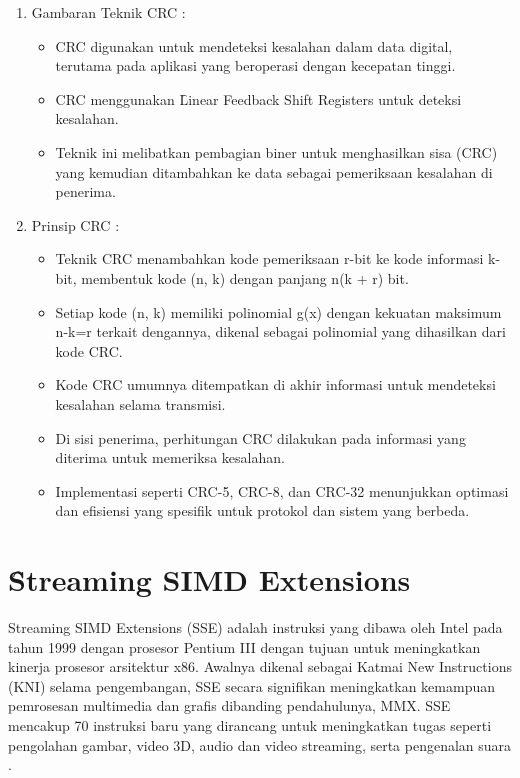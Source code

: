\begin{enumerate}
	\item Gambaran Teknik CRC \cite{zhangLowComplexityCRC}:
	      \begin{itemize}
		      \item CRC digunakan untuk mendeteksi kesalahan dalam data digital, terutama pada aplikasi yang beroperasi dengan kecepatan tinggi.
		      \item CRC menggunakan \f{Linear Feedback Shift Registers} untuk deteksi kesalahan.
		      \item Teknik ini melibatkan pembagian biner untuk menghasilkan sisa (CRC) yang kemudian ditambahkan ke data sebagai pemeriksaan kesalahan di penerima.
	      \end{itemize}

	\item Prinsip CRC \cite{SrideviCRCDataRecovery}:
	      \begin{itemize}
		      \item Teknik CRC menambahkan kode pemeriksaan r-bit ke kode informasi k-bit, membentuk kode (n, k) dengan panjang n(k + r) bit.
		      \item Setiap kode (n, k) memiliki polinomial g(x) dengan kekuatan maksimum n-k=r terkait dengannya, dikenal sebagai polinomial yang dihasilkan dari kode CRC.
		      \item Kode CRC umumnya ditempatkan di akhir informasi untuk mendeteksi kesalahan selama transmisi.
		      \item Di sisi penerima, perhitungan CRC dilakukan pada informasi yang diterima untuk memeriksa kesalahan.
		      \item Implementasi seperti CRC-5, CRC-8, dan CRC-32 menunjukkan optimasi dan efisiensi yang spesifik untuk protokol dan sistem yang berbeda.
	      \end{itemize}
\end{enumerate}

\section{\f{Streaming SIMD Extensions}}
Streaming SIMD Extensions (SSE) adalah instruksi yang dibawa oleh Intel pada tahun 1999 dengan prosesor Pentium III dengan tujuan untuk meningkatkan kinerja prosesor arsitektur x86. Awalnya dikenal sebagai Katmai New Instructions (KNI) selama pengembangan, SSE secara signifikan meningkatkan kemampuan pemrosesan multimedia dan grafis dibanding pendahulunya, MMX. SSE mencakup 70 instruksi baru yang dirancang untuk meningkatkan tugas seperti pengolahan gambar, video 3D, audio dan video streaming, serta pengenalan suara \cite{informitStreamingSIMD}.

